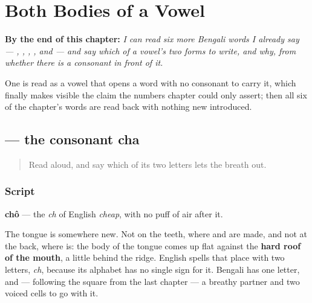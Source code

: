 
\chapter{Both Bodies of a Vowel}
\label{ch:bn-both-bodies-of-a-vowel}

\begin{chapteropening}
\textbf{By the end of this chapter:} \emph{I can read six more Bengali words I already say — , , , ,  and  — and say which of a vowel's two forms to write, and why, from whether there is a consonant in front of it.}

One is read as a vowel that opens a word with no consonant to carry it, which finally makes visible the claim the numbers chapter could only assert; then all six of the chapter's words are read back with nothing new introduced.
\end{chapteropening}

\section[chô]{ — the consonant cha}

\label{lesson:BN-W04-cha}



\begin{quote}
Read \textbf{} aloud, and say which of its two letters lets the breath out.
\end{quote}

\subsection*{Script}
\begin{quote}
\end{quote}

\textbf{chô} — the \emph{ch} of English \emph{cheap}, with no puff of air after it.

The tongue is somewhere new. Not on the teeth, where \textbf{} and \textbf{} are made, and not at the back, where \textbf{} is: the body of the tongue comes up flat against the \textbf{hard roof of the mouth}, a little behind the ridge. English spells that place with two letters, \emph{ch}, because its alphabet has no single sign for it. Bengali has one letter, and — following the square from the last chapter — a breathy partner and two voiced cells to go with it.

